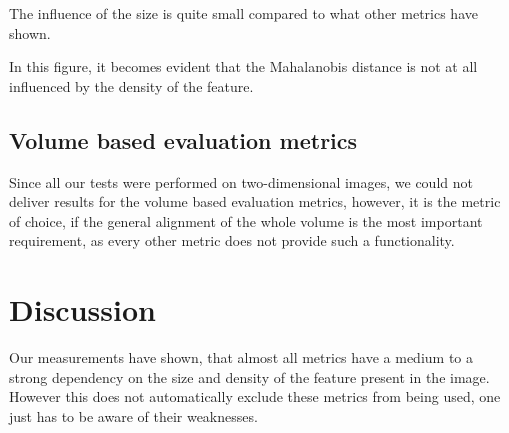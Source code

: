\documentclass[journal]{IEEEtran}
\begin{document}
The influence of the size is quite small compared to what other metrics have shown.

 
In this figure, it becomes evident that the Mahalanobis distance is not at all influenced by the density of the feature.
 
 
 

\subsection{Volume based evaluation metrics}
Since all our tests were performed on two-dimensional images, we could not deliver results for the volume based evaluation metrics, however, it is the metric of choice, if the general alignment of the whole volume is the most important requirement, as every other metric does not provide such a functionality.


\clearpage

\section{Discussion}
\label{Discussion}

Our measurements have shown, that almost all metrics have a medium to a strong dependency on the size and density of the feature present in the image. However this does not automatically exclude these metrics from being used, one just has to be aware of their weaknesses.

\hspace{2in}
\end{document}
